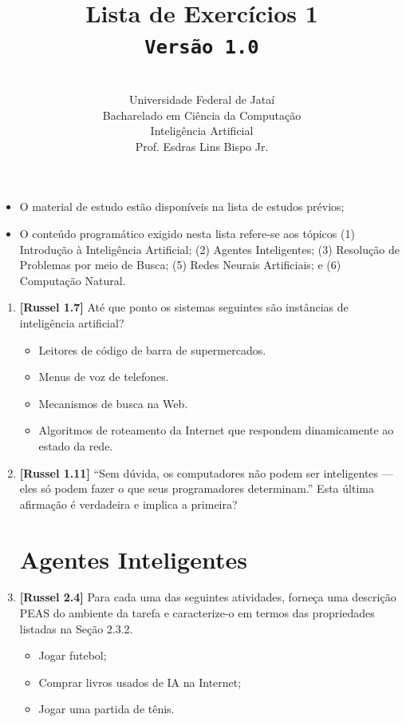 \documentclass[12pt,a4paper,oneside]{article}
\author{\\Universidade Federal de Jataí \\Bacharelado em Ciência da Computação \\Inteligência Artificial \\Prof. Esdras Lins Bispo Jr.}
\title{
	{\sc \huge Lista de Exercícios 1} 
	\\{\tt Versão 1.0}
}
\begin{document}
\maketitle

\begin{itemize}
	\item O material de estudo estão disponíveis na lista de estudos prévios;
	\item O conteúdo programático exigido nesta lista refere-se aos tópicos (1) Introdução à Inteligência Artificial; (2) Agentes Inteligentes; (3) Resolução de Problemas por meio de Busca; (5) Redes Neurais Artificiais; e (6) Computação Natural.
\end{itemize}

\begin{enumerate}	
	
	\section{Introdução à Inteligência Artificial}

	\item {\bf [Russel 1.7]} Até que ponto os sistemas seguintes são instâncias de inteligência artificial?
 		\begin{itemize}
 			\item Leitores de código de barra de supermercados.
			\item Menus de voz de telefones.
			\item Mecanismos de busca na Web.
			\item Algoritmos de roteamento da Internet que respondem dinamicamente ao estado da rede.
		\end{itemize}
	
	\item {\bf [Russel 1.11]} ``Sem dúvida, os computadores não podem ser inteligentes — eles só podem fazer o que seus programadores determinam.'' Esta última afirmação é verdadeira e implica a primeira?	

	\section{Agentes Inteligentes}

	\item {\bf [Russel 2.4]} Para cada uma das seguintes atividades, forneça uma descrição PEAS do ambiente da tarefa e caracterize-o em termos das propriedades listadas na Seção 2.3.2.
		\begin{itemize}
			\item Jogar futebol;
			\item Comprar livros usados de IA na Internet;
			\item Jogar uma partida de tênis.
		\end{itemize}
	

\end{enumerate}
\end{document}
